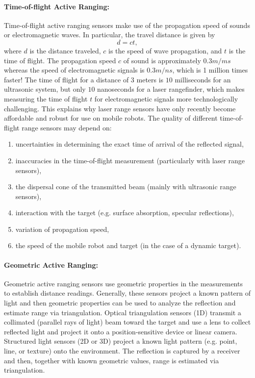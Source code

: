 \paragraph{Time-of-flight Active Ranging:} 
Time-of-flight active ranging sensors make use of the propagation speed of sounds or electromagnetic waves. In particular, the travel distance is given by 
\begin{equation*}
    d = c t,
\end{equation*} 
where $d$ is the distance traveled, $c$ is the speed of wave propagation, and $t$ is the time of flight. The propagation speed $c$ of sound is approximately $0.3 m/ms$ whereas the speed of electromagnetic signals is $0.3 m/ns$, which is 1 million times faster! The time of flight for a distance of $3$ meters is $10$ milliseconds for an ultrasonic system, but only $10$ nanoseconds for a laser rangefinder, which makes measuring the time of flight $t$ for electromagnetic signals more technologically challenging. This explains why laser range sensors have only recently become affordable and robust for use on mobile robots.
The quality of different time-of-flight range sensors may depend on:
\begin{enumerate}
    \item uncertainties in determining the exact time of arrival of the reflected signal,
    \item inaccuracies in the time-of-flight measurement (particularly with laser range sensors),
    \item the dispersal cone of the transmitted beam (mainly with ultrasonic range sensors),
    \item interaction with the target (e.g. surface absorption, specular reflections),
    \item variation of propagation speed,
    \item the speed of the mobile robot and target (in the case of a dynamic target).
\end{enumerate}


\paragraph{Geometric Active Ranging:} 
Geometric active ranging sensors use geometric properties in the measurements to establish distance readings. Generally, these sensors project a known pattern of light and then geometric properties can be used to analyze the reflection and estimate range via triangulation.
Optical triangulation sensors (1D) transmit a collimated (parallel rays of light) beam toward the target and use a lens to collect reflected light and project it onto a position-sensitive device or linear camera. Structured light sensors (2D or 3D) project a known light pattern (e.g. point, line, or texture) onto the environment. The reflection is captured by a receiver and then, together with known geometric values, range is estimated via triangulation. 

